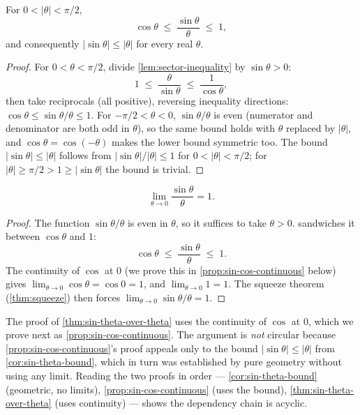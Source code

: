\begin{corollary}\label{cor:sin-theta-bound}
For \(0 < \lvert \theta \rvert < \pi/2\),
\[
\cos \theta \;\leq\; \frac{\sin \theta}{\theta} \;\leq\; 1,
\]
and consequently \(\lvert \sin \theta \rvert \leq \lvert \theta \rvert\) for every real \(\theta\).
\end{corollary}

\begin{proof}
For \(0 < \theta < \pi/2\), divide \cref{lem:sector-inequality} by \(\sin \theta > 0\):
\[
1 \;\leq\; \frac{\theta}{\sin \theta} \;\leq\; \frac{1}{\cos \theta},
\]
then take reciprocals (all positive), reversing inequality directions: \(\cos \theta \leq \sin \theta / \theta \leq 1\). For \(-\pi/2 < \theta < 0\), \(\sin \theta / \theta\) is even (numerator and denominator are both odd in \(\theta\)), so the same bound holds with \(\theta\) replaced by \(\lvert \theta \rvert\), and \(\cos \theta = \cos(-\theta)\) makes the lower bound symmetric too. The bound \(\lvert \sin \theta \rvert \leq \lvert \theta \rvert\) follows from \(\lvert \sin \theta \rvert / \lvert \theta \rvert \leq 1\) for \(0 < \lvert \theta \rvert < \pi/2\); for \(\lvert \theta \rvert \geq \pi/2 > 1 \geq \lvert \sin \theta \rvert\) the bound is trivial.
\end{proof}

\begin{theorem}\label{thm:sin-theta-over-theta}
\[
\lim_{\theta \to 0} \frac{\sin \theta}{\theta} = 1.
\]
\end{theorem}

\begin{proof}
The function \(\sin \theta / \theta\) is even in \(\theta\), so it suffices to take \(\theta > 0\).  sandwiches it between \(\cos \theta\) and \(1\):
\[
\cos \theta \;\leq\; \frac{\sin \theta}{\theta} \;\leq\; 1.
\]
The continuity of \(\cos\) at \(0\) (we prove this in \cref{prop:sin-cos-continuous} below) gives \(\lim_{\theta \to 0} \cos \theta = \cos 0 = 1\), and \(\lim_{\theta \to 0} 1 = 1\). The squeeze theorem (\cref{thm:squeeze}) then forces \(\lim_{\theta \to 0} \sin \theta / \theta = 1\).
\end{proof}

\begin{caution}
The proof of \cref{thm:sin-theta-over-theta} uses the continuity of \(\cos\) at \(0\), which we prove next as \cref{prop:sin-cos-continuous}. The argument is \emph{not} circular because \cref{prop:sin-cos-continuous}'s proof appeals only to the bound \(\lvert \sin \theta \rvert \leq \lvert \theta \rvert\) from \cref{cor:sin-theta-bound}, which in turn was established by pure geometry without using any limit. Reading the two proofs in order --- \cref{cor:sin-theta-bound} (geometric, no limits), \cref{prop:sin-cos-continuous} (uses the bound), \cref{thm:sin-theta-over-theta} (uses continuity) --- shows the dependency chain is acyclic.
\end{caution}


